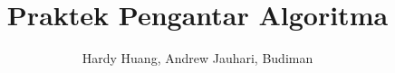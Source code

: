 \documentclass[a4paper,11pt]{report}
\author{Hardy Huang, Andrew Jauhari, Budiman}
\title{Praktek Pengantar Algoritma}
\begin{document}
\renewcommand\contentsname{Daftar Isi}
\tableofcontents \clearpage

\renewcommand{\chaptername}{Modul}
\renewcommand{\figurename}{Gambar}
\renewcommand{\appendixname}{Lampiran}


%
%
%
%
%
%
%
\appendix

%
\end{document}
